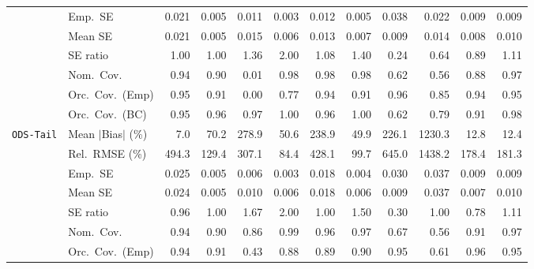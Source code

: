 \begin{landscape}
\begin{longtable}{llrrrrrrrrrr}
 & Emp.\ SE & 0.021 & 0.005 & 0.011 & 0.003 & 0.012 & 0.005 & 0.038 & 0.022 & 0.009 & 0.009 \\
 & Mean SE & 0.021 & 0.005 & 0.015 & 0.006 & 0.013 & 0.007 & 0.009 & 0.014 & 0.008 & 0.010 \\
 & SE ratio & \cellcolor{rankone}1.00 & \cellcolor{rankone}1.00 & 1.36 & 2.00 & \cellcolor{ranktwo}1.08 & 1.40 & 0.24 & 0.64 & \cellcolor{rankthree}0.89 & \cellcolor{rankthree}1.11 \\
 & Nom.\ Cov. & \cellcolor{rankone}0.94 & 0.90 & 0.01 & \cellcolor{rankthree}0.98 & \cellcolor{rankthree}0.98 & \cellcolor{rankthree}0.98 & 0.62 & 0.56 & 0.88 & \cellcolor{ranktwo}0.97 \\
 & Orc.\ Cov.\ (Emp) & \cellcolor{rankone}0.95 & \cellcolor{rankthree}0.91 & 0.00 & 0.77 & \cellcolor{ranktwo}0.94 & \cellcolor{rankthree}0.91 & \cellcolor{ranktwo}0.96 & 0.85 & \cellcolor{ranktwo}0.94 & \cellcolor{rankone}0.95 \\
 & Orc.\ Cov.\ (BC) & \cellcolor{rankone}0.95 & \cellcolor{ranktwo}0.96 & \cellcolor{rankthree}0.97 & 1.00 & \cellcolor{ranktwo}0.96 & 1.00 & 0.62 & 0.79 & 0.91 & 0.98 \\
\addlinespace[2pt]
\quad \texttt{ODS-Tail} & Mean $|$Bias$|$ (\%) & \cellcolor{rankone}7.0 & 70.2 & 278.9 & 50.6 & 238.9 & 49.9 & 226.1 & 1230.3 & \cellcolor{rankthree}12.8 & \cellcolor{ranktwo}12.4 \\
 & Rel.\ RMSE (\%) & 494.3 & \cellcolor{rankthree}129.4 & 307.1 & \cellcolor{rankone}84.4 & 428.1 & \cellcolor{ranktwo}99.7 & 645.0 & 1438.2 & 178.4 & 181.3 \\
 & Emp.\ SE & 0.025 & 0.005 & 0.006 & 0.003 & 0.018 & 0.004 & 0.030 & 0.037 & 0.009 & 0.009 \\
 & Mean SE & 0.024 & 0.005 & 0.010 & 0.006 & 0.018 & 0.006 & 0.009 & 0.037 & 0.007 & 0.010 \\
 & SE ratio & \cellcolor{ranktwo}0.96 & \cellcolor{rankone}1.00 & 1.67 & 2.00 & \cellcolor{rankone}1.00 & 1.50 & 0.30 & \cellcolor{rankone}1.00 & 0.78 & \cellcolor{rankthree}1.11 \\
 & Nom.\ Cov. & \cellcolor{rankone}0.94 & 0.90 & 0.86 & \cellcolor{rankthree}0.99 & \cellcolor{rankone}0.96 & \cellcolor{ranktwo}0.97 & 0.67 & 0.56 & \cellcolor{rankthree}0.91 & \cellcolor{ranktwo}0.97 \\
 & Orc.\ Cov.\ (Emp) & \cellcolor{ranktwo}0.94 & \cellcolor{rankthree}0.91 & 0.43 & 0.88 & 0.89 & 0.90 & \cellcolor{rankone}0.95 & 0.61 & \cellcolor{ranktwo}0.96 & \cellcolor{rankone}0.95 \\

\end{longtable}
\end{landscape}
